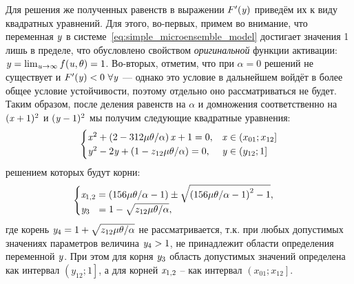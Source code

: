 Для решения же полученных равенств в выражении $F^{\prime}(\mathit{y})$ приведём их к виду квадратных уравнений. Для этого, во-первых, примем во внимание, что переменная $\mathit{y}$ в системе~\eqref{eq:simple_microensemble_model} достигает значения 1 лишь в пределе, что обусловлено свойством \textit{оригинальной} функции активации: $\mathit{y} = \lim_{\mathit{u} \to \infty} f(\mathit{u}, \theta) = 1$. Во-вторых, отметим, что при $\alpha = 0$ решений не существует и $F^{\prime}(\mathit{y}) < 0\ \forall \mathit{y}$ --- однако это условие в дальнейшем войдёт в более общее условие устойчивости, поэтому отдельно оно рассматриваться не будет. Таким образом, после деления равенств на $\alpha$ и домножения соответственно на $(\mathit{x} + 1)^{2}$ и $(\mathit{y} - 1)^{2}$ мы получим следующие квадратные уравнения:
\begin{equation}
    \nonumber
    \begin{cases}
        \mathit{x}^{2} + \left( 2 - 312 \mu \theta / \alpha \right) \mathit{x} + 1 = 0,     & \mathit{x} \in \left(x_{01}; x_{12}\right] \\
        \mathit{y}^{2} - 2 \mathit{y} + \left( 1 - z_{12} \mu \theta / \alpha \right) = 0,  & \mathit{y} \in \left(y_{12}; 1\right] \\
    \end{cases}
\end{equation}
решением которых будут корни:
\begin{equation}
    \begin{cases}
        \label{eq:origin_stability_bounds_y}
        \scalar{x}_{1,2} = \left( 156 \mu \theta / \alpha - 1\right) \pm \sqrt{\left( 156 \mu \theta / \alpha - 1\right)^{2} - 1}, \\ %
        \scalar{y}_{3\phantom{,4}}   = 1 - \sqrt{z_{12} \mu \theta / \alpha},                                                      \\ %
    \end{cases}
\end{equation}
где корень $\mathit{y}_{4} = 1 + \sqrt{z_{12} \mu \theta / \alpha}$ не рассматривается, т.к. при любых допустимых значениях параметров величина $\mathit{y}_{4} > 1$, \ie не принадлежит области определения переменной $\mathit{y}$. При этом для корня $\mathit{y}_{3}$ область допустимых значений определена как интервал $\left(y_{12}; 1\right]$, а для корней $\mathit{x}_{1,2}$ -- как интервал $\left(x_{01}; x_{12}\right]$.

